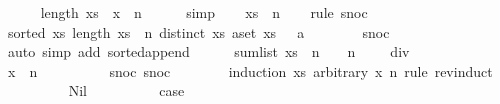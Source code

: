 \begin{isabellebody}
\ \ \ \ \isamarkupfalse%
\ {\isacharbackquoteopen}length\ {\isacharparenleft}xs\ {\isacharat}\ {\isacharbrackleft}x{\isacharbrackright}{\isacharparenright}\ {\isacharequal}\ n{\isacharbackquoteclose}\isanewline
\ \ \ \ \isamarkupfalse%
\ simp\isanewline
\ \ \isamarkupfalse%
\ {\isachardoublequoteopen}xs\ {\isacharequal}\ {\isacharbrackleft}{}{\isachardot}{\isachardot}{\isacharless}{\isacharparenleft}n{\isacharminus}{}{\isacharparenright}{\isacharplus}{}{\isacharbrackright}{\isachardoublequoteclose}\isanewline
\ \ \isamarkupfalse%
\ {\isacharparenleft}rule\ snoc{\isacharparenleft}{}{\isacharparenright}{\isacharparenright}\isanewline
\ \ \ \ \isamarkupfalse%
\ {\isachardoublequoteopen}sorted\ xs{\isachardoublequoteclose}\ {\isachardoublequoteopen}length\ xs\ {\isacharequal}\ n{\isacharminus}{}{\isachardoublequoteclose}\ {\isachardoublequoteopen}distinct\ xs{\isachardoublequoteclose}\ {\isachardoublequoteopen}{\isasymforall}a{\isasymin}set\ xs{\isachardot}\ {}\ {\isacharless}\ a{\isachardoublequoteclose}\isanewline
\ \ \ \ \ \ \isamarkupfalse%
\ snoc{\isacharparenleft}{}{\isacharminus}{}{\isacharparenright}\isanewline
\ \ \ \ \ \ \isamarkupfalse%
\ {\isacharparenleft}auto\ simp\ add{\isacharcolon}\ sorted{\isacharunderscore}append{\isacharparenright}\isanewline
\ \ \ \ \isamarkupfalse%
\ {\isachardoublequoteopen}sum{\isacharunderscore}list\ xs\ {\isasymle}\ {\isacharparenleft}n\ {\isacharminus}\ {}{\isacharparenright}\ {\isacharasterisk}\ {\isacharparenleft}n\ {\isacharminus}\ {}\ {\isacharplus}\ {}{\isacharparenright}\ div\ {}{\isachardoublequoteclose}\isanewline
\ \ \ \ \isamarkupfalse%
{\isacharminus}\isanewline
\ \ \ \ \ \ \isamarkupfalse%
\ {\isachardoublequoteopen}x\ {\isasymge}\ n{\isachardoublequoteclose}\isanewline
\ \ \ \ \ \ \ \ \isamarkupfalse%
\ snoc{\isacharparenleft}{}{\isacharminus}{}{\isacharparenright}\ snoc{\isacharparenleft}{}{\isacharparenright}\isanewline
\ \ \ \ \ \ \isamarkupfalse%
\ {\isacharparenleft}induction\ xs\ arbitrary{\isacharcolon}\ x\ n\ rule{\isacharcolon}\ rev{\isacharunderscore}induct{\isacharparenright}\isanewline
\ \ \ \ \ \ \ \ \isamarkupfalse%
\ Nil\isanewline
\ \ \ \ \ \ \ \ \isamarkupfalse%
\ {\isacharquery}case\isanewline

\end{isabellebody}
